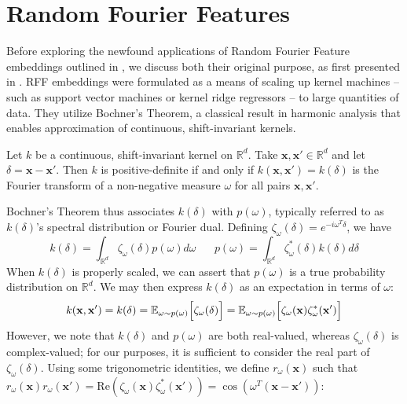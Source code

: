 \documentclass[11pt]{article}
\newcommand{\E}{\mathbb{E}}
\newcommand{\R}{\mathbb{R}}
\begin{document}
\section{Random Fourier Features}
Before exploring the newfound applications of Random Fourier Feature embeddings outlined in \cite{Tancik20}, we discuss both their original purpose, as first presented in \cite{RFF}. RFF embeddings were formulated as a means of scaling up kernel machines – such as support vector machines or kernel ridge regressors – to large quantities of data. They utilize Bochner's Theorem, a classical result in harmonic analysis that enables approximation of continuous, shift-invariant kernels.
\begin{btheorem*}
    Let $k$ be a continuous, shift-invariant kernel on $\R^d$. Take $\mathbf{x}, \mathbf{x}' \in \R^d$ and let $\delta = \mathbf{x} - \mathbf{x'}$. Then $k$ is positive-definite if and only if $k(\mathbf{x}, \mathbf{x}') = k(\delta)$ is the Fourier transform of a non-negative measure $\omega$ for all pairs $\mathbf{x}, \mathbf{x}'$.
\end{btheorem*} 
\noindent Bochner's Theorem thus associates $k(\delta)$ with $p(\omega)$,  typically referred to as $k(\delta)$'s spectral distribution or Fourier dual. Defining $\zeta_\omega(\delta) = e^{-i\omega^T\delta}$, we have
$$k(\delta) = \int_{\R^d}\zeta_\omega(\delta)p(\omega)d\omega \hspace{20pt} p(\omega) = \int_{\R^d}\zeta_\omega^*(\delta)k(\delta)d\delta$$
When $k(\delta)$ is properly scaled, we can assert that $p(\omega)$ is a true probability distribution on $\R^d$. We may then express $k(\delta)$ as an expectation in terms of $\omega$:
$$k(\mathbf{x}, \mathbf{x}') = k(\delta) = \E_{\omega \sim p(\omega)}\Bigl[\zeta_\omega(\delta)\Bigr] = \E_{\omega \sim p(\omega)}\Bigl[ \zeta_\omega(\mathbf{x})\zeta_\omega^*(\mathbf{x}')\Bigr]$$
However, we note that $k(\delta)$ and $p(\omega)$ are both real-valued, whereas $\zeta_\omega(\delta)$ is complex-valued; for our purposes, it is sufficient to consider the real part of $\zeta_\omega(\delta)$. Using some trigonometric identities, we define $r_\omega(\mathbf{x})$ such that $r_\omega(\mathbf{x})r_\omega(\mathbf{x}') = \text{Re}(\zeta_\omega(\mathbf{x})\zeta^*_\omega(\mathbf{x}')) = \cos(\omega^T(\mathbf{x} - \mathbf{x}'))$: 
\end{document}
